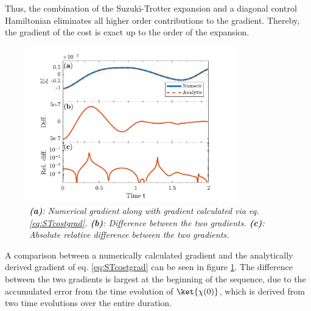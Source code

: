 Thus, the combination of the Suzuki-Trotter expansion and a diagonal control Hamiltonian eliminates all higher order contributions to the gradient. Thereby, the gradient of the cost is exact up to the order of the expansion.
\begin{figure}[!h]
    \centering
    \includegraphics[width=0.8\textwidth]{Figures/CompareGradientsGRAPE.pdf}
    \caption{\textit{\textbf{(a)}: Numerical gradient along with gradient calculated via eq. \eqref{eq:STcostgrad}. \textbf{(b)}: Difference between the two gradients. \textbf{(c)}: Absolute relative difference between the two gradients.}}
    \label{fig:CompareGradientsGRAPE}
\end{figure}
A comparison between a numerically calculated gradient and the analytically derived gradient of eq. \eqref{eq:STcostgrad} can be seen in figure \ref{fig:CompareGradientsGRAPE}. The difference between the two gradients is largest at the beginning of the sequence, due to the accumulated error from the time evolution of $\ket{\chi (0)}$, which is derived from two time evolutions over the entire duration.


